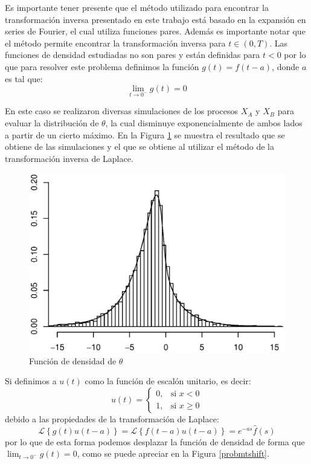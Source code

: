 \documentclass[11pt]{article}
\numberwithin{equation}{section} %
\begin{document}
Es importante tener presente que el método utilizado para encontrar la transformación inversa presentado en este trabajo está basado en la expansión en series de Fourier, el cual utiliza funciones pares. Además es importante notar que el método permite encontrar la transformación inversa para $t \in (0,T)$. Las funciones de densidad estudiadas no son pares y están definidas para $t<0$ por lo que para resolver este problema definimos la función $g(t)=
f(t-a)$, donde $a$ es tal que:
\[
\lim_{t\to 0^-} g(t)=0
\]

En este caso se realizaron diversas simulaciones de los procesos $X_A$ y $X_B$ para evaluar la distribución de $\theta$, la cual disminuye exponencialmente de ambos lados a partir de un cierto máximo. En la Figura \ref{probmt} se muestra el resultado que se obtiene de las simulaciones y el que se obtiene al utilizar el método de la transformación inversa de Laplace.\\

\begin{figure}[htbp] \centering
\includegraphics[scale=0.75,trim=0 1cm 0 1cm]{probpm.eps}
\caption{Función de densidad de $\theta$}
\label{probmt}
\end{figure}

Si definimos a $u(t)$ como la función de escalón unitario, es decir:
\[
u(t) =
\begin{cases}
0, & \mbox{si } x<0 \\
1, & \mbox{si } x\geq0
\end{cases}
\]
debido a las propiedades de la transformación de Laplace:
\[
\mathcal{L} \left\{g(t)u(t-a)\right\}=\mathcal{L} \left\{f(t-a)u(t-a)\right\}=e^{-as}\hat{f}(s)
\]
por lo que de esta forma podemos desplazar la función de densidad de forma que $\lim_{t\to 0^-} g(t)=0$, como se puede apreciar en la Figura \ref{probmtshift}.\\
\end{document}
